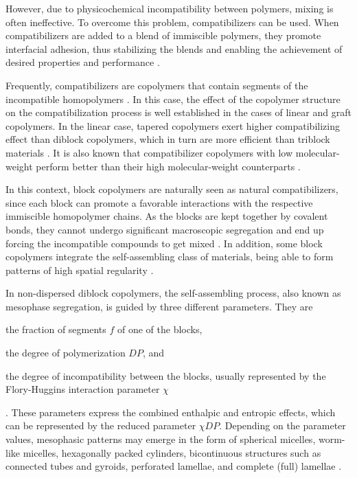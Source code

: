 \documentclass[
journal=mamobx,
manuscript=article,
]{achemso}
\begin{document}
However, due to physicochemical incompatibility between polymers, mixing is often ineffective.
To overcome this problem, compatibilizers can be used.
When compatibilizers are added to a blend of immiscible polymers, they promote interfacial adhesion, thus stabilizing the blends and enabling the achievement of desired properties and performance \cite{Baker_2001}.

Frequently, compatibilizers are copolymers that contain segments of the incompatible homopolymers \cite{Baker_2001, Wang_2012, Chuai_2003, Lyatskaya_1996, Yuan_2006}. In this case, the effect of the copolymer structure on the compatibilization process is well established in the cases of linear \cite{Chuai_2003} and graft \cite{Lyatskaya_1996, Wang_2012} copolymers.
In the linear case, tapered copolymers exert higher compatibilizing effect than diblock copolymers, which in turn are more efficient than triblock materials \cite{Yuan_2006, Kim_2006, Lemos_2015}.
It is also known that compatibilizer copolymers with low molecular-weight perform better than their high molecular-weight counterparts \cite{Harrats_1995}.

In this context, block copolymers are naturally seen as natural compatibilizers, since each block can promote a favorable interactions with the respective immiscible homopolymer chains.
As the blocks are kept together by covalent bonds, they cannot undergo significant macroscopic segregation and end up forcing the incompatible compounds to get mixed \cite{Baker_2001}.
In addition, some block copolymers integrate the self-assembling class of materials, being able to form patterns of high spatial regularity \cite{Leibler_1980}.

In non-dispersed diblock copolymers, the self-assembling process, also known as mesophase segregation, is guided by three different parameters.
They are \begin{enumerate*}[label=(\roman*)] \item the fraction of segments $f$ of one of the blocks, \item the degree of polymerization $DP$, and \item the degree of incompatibility between the blocks, usually represented by the Flory-Huggins interaction parameter $\chi$ \end{enumerate*} \cite{Bates_1990}.
These parameters express the combined enthalpic and entropic effects, which can be represented by the reduced parameter $\chi DP$.
Depending on the parameter values, mesophasic patterns may emerge in the form of spherical micelles, worm-like micelles, hexagonally packed cylinders, bicontinuous structures such as connected tubes and gyroids, perforated lamellae, and complete (full) lamellae \cite{Leibler_1980}.
\end{document}
